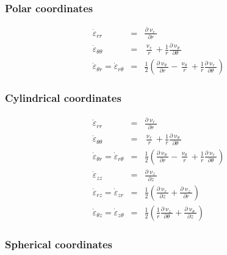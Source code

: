 \subsubsection{Polar coordinates}

\begin{eqnarray}
\dot\varepsilon_{rr} 
&=& \frac{\partial \upnu_r}{\partial r} \\
\dot\varepsilon_{\theta\theta} 
&=& \frac{\upnu_r}{r} + \frac{1}{r} \frac{\partial \upnu_\theta}{\partial \theta}  \\
\dot\varepsilon_{\theta r} = \dot\varepsilon_{r\theta} 
&=& \frac{1}{2} \left(   \frac{\partial \upnu_\theta}{\partial r} - \frac{\upnu_\theta}{r} 
+\frac{1}{r} \frac{\partial \upnu_r}{\partial \theta}  \right) 
\end{eqnarray}

\subsubsection{Cylindrical coordinates}

\begin{eqnarray}
\dot\varepsilon_{rr} 
&=& \frac{\partial \upnu_r}{\partial r} 
\\
\dot\varepsilon_{\theta\theta} 
&=& \frac{\upnu_r}{r} + \frac{1}{r} \frac{\partial \upnu_\theta}{\partial \theta}  
\\
\dot\varepsilon_{\theta r} = \dot\varepsilon_{r\theta} 
&=& \frac{1}{2} \left(   \frac{\partial \upnu_\theta}{\partial r} - \frac{\upnu_\theta}{r} 
+\frac{1}{r} \frac{\partial \upnu_r}{\partial \theta}  \right)
\\
\dot\varepsilon_{zz} 
&=& \frac{\partial \upnu_z}{\partial z} 
\\
\dot{\varepsilon}_{rz} = \dot{\varepsilon}_{zr} 
&=& \frac{1}{2}\left( \frac{\partial \upnu_r}{\partial z} + \frac{\partial \upnu_z}{\partial r}  \right) 
\\
\dot{\varepsilon}_{\theta z} = \dot{\varepsilon}_{z \theta} &=& \frac{1}{2}\left( 
\frac{1}{r} \frac{\partial \upnu_z}{\partial \theta} + \frac{\partial \upnu_\theta}{\partial z}  \right) 
\end{eqnarray}

\subsubsection{Spherical coordinates}


